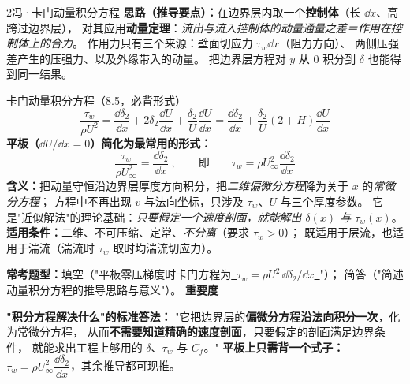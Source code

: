 \begin{kaodian}{2}{冯·卡门动量积分方程}
\textbf{思路（推导要点）：}在边界层内取一个\textbf{控制体}（长 $\dd x$、高跨过边界层），
对其应用\textbf{动量定理}：\emph{流出与流入控制体的动量通量之差＝作用在控制体上的合力}。
作用力只有三个来源：壁面切应力 $\tau_w\dd x$（阻力方向）、
两侧压强差产生的压强力、以及外缘带入的动量。
把边界层方程对 $y$ 从 $0$ 积分到 $\delta$ 也能得到同一结果。

\begin{gongshi}{卡门动量积分方程（8.5，必背形式）}
\[ \frac{\tau_w}{\rho U^2}=\frac{\dd \delta_2}{\dd x}
   +2\delta_2\frac{\dd U}{\dd x}+\frac{\delta_2}{U}\frac{\dd U}{\dd x}
   =\frac{\dd \delta_2}{\dd x}+\frac{\delta_2}{U}\left(2+H\right)\frac{\dd U}{\dd x} \]
\textbf{平板（$\dd U/\dd x=0$）简化为最常用的形式：}
\[ \frac{\tau_w}{\rho U_\infty^2}=\frac{\dd \delta_2}{\dd x}\ ,\qquad\text{即}\qquad
   \tau_w=\rho U_\infty^2\frac{\dd \delta_2}{\dd x} \]
\textbf{含义：}把动量守恒沿边界层厚度方向积分，把\emph{二维偏微分方程}降为关于 $x$ 的\emph{常微分方程}；
方程中不再出现 $v$ 与法向坐标，只涉及 $\tau_w$、$U$ 与三个厚度参数。
它是"近似解法"的理论基础：\emph{只要假定一个速度剖面，就能解出 $\delta(x)$ 与 $\tau_w(x)$}。\\
\textbf{适用条件：}二维、不可压缩、定常、\emph{不分离}（要求 $\tau_w>0$）；
既适用于层流，也适用于湍流（湍流时 $\tau_w$ 取时均湍流切应力）。
\end{gongshi}

\textbf{常考题型：}填空（"平板零压梯度时卡门方程为\underline{\ $\tau_w=\rho U^2\,\dd\delta_2/\dd x$\ }"）；
简答（"简述动量积分方程的推导思路与意义"）。
\textbf{重要度 }\quad{}\quad{}

\begin{banfa}
\textbf{"积分方程解决什么"的标准答法：}
"它把边界层的\textbf{偏微分方程沿法向积分一次}，化为常微分方程，
从而\textbf{不需要知道精确的速度剖面}，只要假定的剖面满足边界条件，
就能求出工程上够用的 $\delta$、$\tau_w$ 与 $C_f$。"
\textbf{平板上只需背一个式子：}$\tau_w=\rho U_\infty^2\dfrac{\dd\delta_2}{\dd x}$，其余推导都可现推。
\end{banfa}
\end{kaodian}

